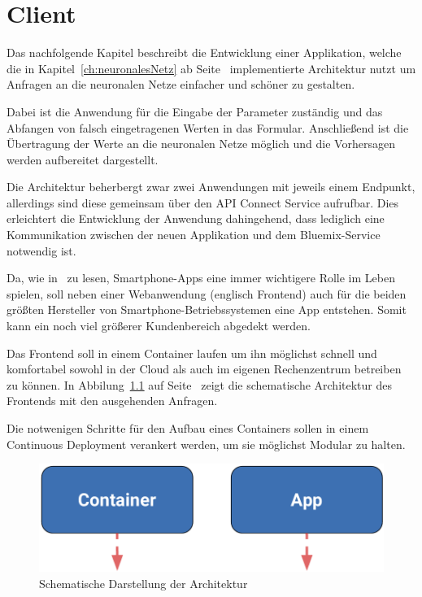 \chapter{Client}
\label{ch:client}
Das nachfolgende Kapitel beschreibt die Entwicklung einer Applikation, welche die in Kapitel~\ref{ch:neuronalesNetz}
ab Seite~\pageref{ch:neuronalesNetz} implementierte Architektur nutzt um Anfragen an die neuronalen Netze einfacher
und schöner zu gestalten.

Dabei ist die Anwendung für die Eingabe der Parameter zuständig und das Abfangen von falsch eingetragenen Werten in
das Formular. Anschließend ist die Übertragung der Werte an die neuronalen Netze möglich und die Vorhersagen werden
aufbereitet dargestellt.

Die Architektur beherbergt zwar zwei Anwendungen mit jeweils einem Endpunkt, allerdings sind diese gemeinsam über
den API Connect Service aufrufbar. Dies erleichtert die Entwicklung der Anwendung dahingehend, dass lediglich eine
Kommunikation zwischen der neuen Applikation und dem Bluemix-Service notwendig ist.

Da, wie in~\cite{online_client_apps} zu lesen, Smartphone-Apps eine immer wichtigere Rolle im Leben spielen, soll neben
einer Webanwendung (englisch Frontend) auch für die beiden größten Hersteller von Smartphone-Betriebssystemen eine App
entstehen. Somit kann ein noch viel größerer Kundenbereich abgedekt werden.

Das Frontend soll in einem Container laufen um ihn möglichst schnell und komfortabel sowohl in der Cloud als auch 
im eigenen Rechenzentrum betreiben zu können. In Abbilung~\ref{fig:schematische_architektur_4} auf 
Seite~\pageref{fig:schematische_architektur_4} zeigt die schematische Architektur des Frontends mit den ausgehenden
Anfragen.

Die notwenigen Schritte für den Aufbau eines Containers sollen in einem Continuous Deployment verankert werden, um sie
möglichst Modular zu halten.

\begin{figure}[h]
    \centering
    \includegraphics[scale=0.5]{images/kapitel_4/architektur_schematisch.pdf}
    \caption{Schematische Darstellung der Architektur}
    \label{fig:schematische_architektur_4}
\end{figure}